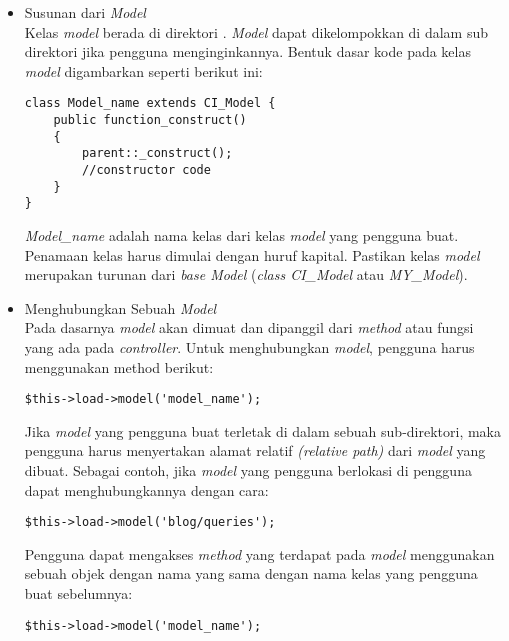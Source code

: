 	\begin{itemize}
		\item Susunan dari \textit{Model} \\
		Kelas \textit{model} berada di direktori . \textit{Model} dapat dikelompokkan di dalam sub direktori jika pengguna menginginkannya. Bentuk dasar kode pada kelas \textit{model} digambarkan seperti berikut ini:
		\begin{lstlisting}[basicstyle=\ttfamily, frame=single,
columns=fullflexible, keepspaces=true, breaklines=true]
class Model_name extends CI_Model {
	public function_construct()
	{
		parent::_construct();
		//constructor code
	}
}
\end{lstlisting}
		
		\textit{Model\_name} adalah nama kelas dari kelas \textit{model} yang pengguna buat. Penamaan kelas harus dimulai dengan huruf kapital. Pastikan kelas \textit{model} merupakan turunan dari \textit{base Model} (\textit{class CI\_Model} atau \textit{MY\_Model}).
		
		\item Menghubungkan Sebuah \textit{Model} \\
		Pada dasarnya \textit{model} akan dimuat dan dipanggil dari \textit{method} atau fungsi yang ada pada \textit{controller}. Untuk menghubungkan \textit{model}, pengguna harus menggunakan method berikut:
		\begin{lstlisting}[basicstyle=\ttfamily, frame=single,
columns=fullflexible, keepspaces=true, breaklines=true]
$this->load->model('model_name');
\end{lstlisting}
		
		Jika \textit{model} yang pengguna buat terletak di dalam sebuah sub-direktori, maka pengguna harus menyertakan alamat relatif \textit{(relative path)} dari \textit{model} yang dibuat. Sebagai contoh, jika \textit{model} yang pengguna berlokasi di  pengguna dapat menghubungkannya dengan cara:
		\begin{lstlisting}[basicstyle=\ttfamily, frame=single,
columns=fullflexible, keepspaces=true, breaklines=true]
$this->load->model('blog/queries');
\end{lstlisting}
		
		Pengguna dapat mengakses \textit{method} yang terdapat pada \textit{model} menggunakan sebuah objek dengan nama yang sama dengan nama kelas yang pengguna buat sebelumnya:
		\begin{lstlisting}[basicstyle=\ttfamily, frame=single,
columns=fullflexible, keepspaces=true, breaklines=true]
$this->load->model('model_name');
		

\end{lstlisting}
\end{itemize}
